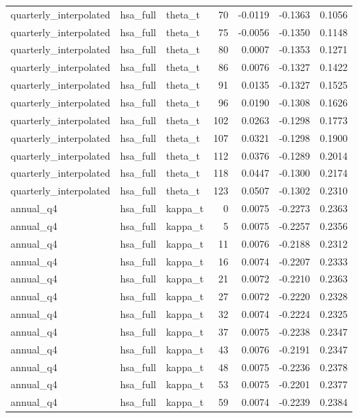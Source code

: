 \begin{tabular}{lllrrrr}
quarterly\_interpolated & hsa\_full & theta\_t & 70 & -0.0119 & -0.1363 & 0.1056 \\
quarterly\_interpolated & hsa\_full & theta\_t & 75 & -0.0056 & -0.1350 & 0.1148 \\
quarterly\_interpolated & hsa\_full & theta\_t & 80 & 0.0007 & -0.1353 & 0.1271 \\
quarterly\_interpolated & hsa\_full & theta\_t & 86 & 0.0076 & -0.1327 & 0.1422 \\
quarterly\_interpolated & hsa\_full & theta\_t & 91 & 0.0135 & -0.1327 & 0.1525 \\
quarterly\_interpolated & hsa\_full & theta\_t & 96 & 0.0190 & -0.1308 & 0.1626 \\
quarterly\_interpolated & hsa\_full & theta\_t & 102 & 0.0263 & -0.1298 & 0.1773 \\
quarterly\_interpolated & hsa\_full & theta\_t & 107 & 0.0321 & -0.1298 & 0.1900 \\
quarterly\_interpolated & hsa\_full & theta\_t & 112 & 0.0376 & -0.1289 & 0.2014 \\
quarterly\_interpolated & hsa\_full & theta\_t & 118 & 0.0447 & -0.1300 & 0.2174 \\
quarterly\_interpolated & hsa\_full & theta\_t & 123 & 0.0507 & -0.1302 & 0.2310 \\
annual\_q4 & hsa\_full & kappa\_t & 0 & 0.0075 & -0.2273 & 0.2363 \\
annual\_q4 & hsa\_full & kappa\_t & 5 & 0.0075 & -0.2257 & 0.2356 \\
annual\_q4 & hsa\_full & kappa\_t & 11 & 0.0076 & -0.2188 & 0.2312 \\
annual\_q4 & hsa\_full & kappa\_t & 16 & 0.0074 & -0.2207 & 0.2333 \\
annual\_q4 & hsa\_full & kappa\_t & 21 & 0.0072 & -0.2210 & 0.2363 \\
annual\_q4 & hsa\_full & kappa\_t & 27 & 0.0072 & -0.2220 & 0.2328 \\
annual\_q4 & hsa\_full & kappa\_t & 32 & 0.0074 & -0.2224 & 0.2325 \\
annual\_q4 & hsa\_full & kappa\_t & 37 & 0.0075 & -0.2238 & 0.2347 \\
annual\_q4 & hsa\_full & kappa\_t & 43 & 0.0076 & -0.2191 & 0.2347 \\
annual\_q4 & hsa\_full & kappa\_t & 48 & 0.0075 & -0.2236 & 0.2378 \\
annual\_q4 & hsa\_full & kappa\_t & 53 & 0.0075 & -0.2201 & 0.2377 \\
annual\_q4 & hsa\_full & kappa\_t & 59 & 0.0074 & -0.2239 & 0.2384 \\

\end{tabular}
